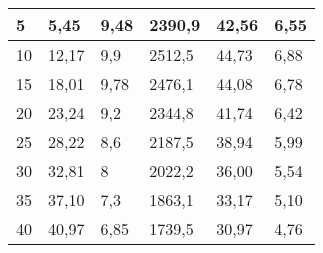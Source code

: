 \begin{table}[ht!]
\begin{tabular}{|l|l|l|l|l|l|}
    \rowcolor[HTML]{C6E0B4} 
    5                                     & 5,45                                   & 9,48                                               & 2390,9                                   & 42,56                                          & 6,55                                    \\ \hline
    \rowcolor[HTML]{E2EFDA} 
    10                                    & 12,17                                  & 9,9                                                & 2512,5                                   & 44,73                                          & 6,88                                    \\ \hline
    \rowcolor[HTML]{C6E0B4} 
    15                                    & 18,01                                  & 9,78                                               & 2476,1                                   & 44,08                                          & \cellcolor[HTML]{FFC000}6,78                                    \\ \hline
    \rowcolor[HTML]{E2EFDA} 
    20                                    & 23,24                                  & 9,2                                                & 2344,8                                   & 41,74                                          & 6,42                                     \\ \hline
    \rowcolor[HTML]{C6E0B4} 
    25                                    & 28,22                                  & 8,6                                                & 2187,5                                   & 38,94                                          & 5,99                                    \\ \hline
    \rowcolor[HTML]{E2EFDA} 
    30                                    & 32,81                                  & 8                                                  & 2022,2                                   & 36,00                                           & 5,54                                     \\ \hline
    \rowcolor[HTML]{C6E0B4} 
    35                                    & 37,10                                 & 7,3                                                & 1863,1                                   & 33,17                                          & 5,10                                    \\ \hline
    \rowcolor[HTML]{E2EFDA} 
    40                                    & 40,97                                  & 6,85                                               & 1739,5                                   & 30,97                                          & 4,76                                    \\ \hline

\end{tabular}
\end{table}
